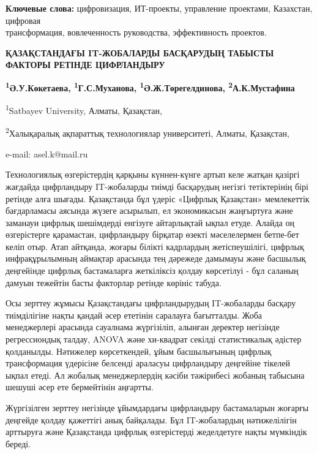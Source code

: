 {\bfseries Ключевые слова:} цифровизация, ИТ-проекты, управление проектами,
Казахстан, цифровая \\трансформация, вовлеченность руководства,
эффективность проектов.

\begin{articleheader}
{\bfseries ҚАЗАҚСТАНДАҒЫ IT-ЖОБАЛАРДЫ БАСҚАРУДЫҢ ТАБЫСТЫ ФАКТОРЫ РЕТІНДЕ ЦИФРЛАНДЫРУ}

{\bfseries
\textsuperscript{1}Ә.У.Көкетаева\textsuperscript{\envelope },
\textsuperscript{1}Г.С.Муханова,
\textsuperscript{1}Ә.Ж.Төрегелдинова,
\textsuperscript{2}А.К.Мустафина
}
\end{articleheader}

\begin{affiliation}
\textsuperscript{1}Satbayev University, Алматы, Қазақстан,

\textsuperscript{2}Халықаралық ақпараттық технологиялар университеті, Алматы, Қазақстан,

e-mail: asel.k@mail.ru
\end{affiliation}

Технологиялық өзгерістердің қарқыны күннен-күнге артып келе жатқан
қазіргі жағдайда цифрландыру IT-жобаларды тиімді басқарудың негізгі
тетіктерінің бірі ретінде алға шығады. Қазақстанда бұл үдеріс «Цифрлық
Қазақстан» мемлекеттік бағдарламасы аясында жүзеге асырылып, ел
экономикасын жаңғыртуға және заманауи цифрлық шешімдерді енгізуге
айтарлықтай ықпал етуде. Алайда оң өзгерістерге қарамастан, цифрландыру
бірқатар өзекті мәселелермен бетпе-бет келіп отыр. Атап айтқанда, жоғары
білікті кадрлардың жетіспеушілігі, цифрлық инфрақұрылымның аймақтар
арасында тең дәрежеде дамымауы және басшылық деңгейінде цифрлық
бастамаларға жеткіліксіз қолдау көрсетілуі - бұл саланың дамуын тежейтін
басты факторлар ретінде көрініс табуда.

Осы зерттеу жұмысы Қазақстандағы цифрландырудың IT-жобаларды басқару
тиімділігіне нақты қандай әсер ететінін саралауға бағытталды. Жоба
менеджерлері арасында сауалнама жүргізіліп, алынған деректер негізінде
регрессиондық талдау, ANOVA және хи-квадрат секілді статистикалық
әдіс\-тер қолданылды. Нәтижелер көрсеткендей, ұйым басшылығының цифрлық
трансформация үдерісіне белсенді араласуы цифрландыру деңгейіне тікелей
ықпал етеді. Ал жобалық менеджерлердің кәсіби тәжірибесі жобаның
табысына шешуші әсер ете бермейтінін аңғартты.

Жүргізілген зерттеу негізінде ұйымдардағы цифрландыру бастамаларын
жоғарғы деңгейде қолдау қажеттігі анық байқалады. Бұл IT-жобалардың
нәтижелілігін арттыруға және Қазақстанда цифрлық өзгерістерді
жеделдетуге нақты мүмкіндік береді.

